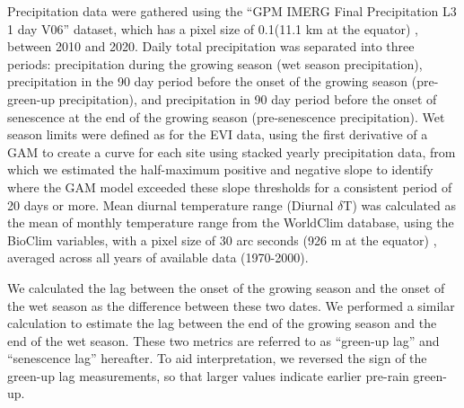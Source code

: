 \begin{refsection}
Precipitation data were gathered using the ``GPM IMERG Final Precipitation L3 1 day V06'' dataset, which has a pixel size of 0.1\textdegree (11.1 km at the equator) \citep{IMERG}, between 2010 and 2020. Daily total precipitation was separated into three periods: precipitation during the growing season (wet season precipitation), precipitation in the 90 day period before the onset of the growing season (pre-green-up precipitation), and precipitation in 90 day period before the onset of senescence at the end of the growing season (pre-senescence precipitation). Wet season limits were defined as for the EVI data, using the first derivative of a GAM to create a curve for each site using stacked yearly precipitation data, from which we estimated the half-maximum positive and negative slope to identify where the GAM model exceeded these slope thresholds for a consistent period of 20 days or more. Mean diurnal temperature range (Diurnal $\delta$T) was calculated as the mean of monthly temperature range from the WorldClim database, using the BioClim variables, with a pixel size of 30 arc seconds (926 m at the equator) \citep{Fick2017}, averaged across all years of available data (1970-2000). 

We calculated the lag between the onset of the growing season and the onset of the wet season as the difference between these two dates. We performed a similar calculation to estimate the lag between the end of the growing season and the end of the wet season. These two metrics are referred to as ``green-up lag'' and ``senescence lag'' hereafter. To aid interpretation, we reversed the sign of the green-up lag measurements, so that larger values indicate earlier pre-rain green-up.


\end{refsection}
